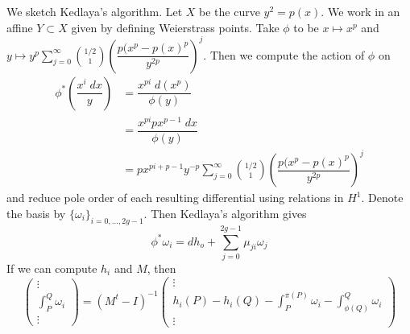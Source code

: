 \noindent{} \par\vspace{\baselineskip}
 

We sketch Kedlaya's algorithm. Let $X$ be the curve $y^2= p(x)$. We work in an affine $Y \subset X$ given by defining Weierstrass points. Take $\phi$ to be $x \mapsto x^p$ and $y \mapsto y^p \sum_{j=0}^\infty \binom{1/2}{1} \left( \dfrac{p(x^p - p(x)^p}{y^{2p}} \right)^j$. Then we compute the action of $\phi$ on
	\[
	\begin{aligned}
	\phi^*\left( \dfrac{x^i \;dx}{y} \right)&= \dfrac{x^{pi} \;d(x^p)}{\phi(y)} \\
	&= \dfrac{x^{pi} p x^{p-1} \;dx}{\phi(y)} \\
	&= p x^{pi + p - 1} y^{-p} \sum_{j=0}^\infty \binom{1/2}{1} \left( \dfrac{p(x^p - p(x)^p}{y^{2p}} \right)^j
	\end{aligned}
	\]
and reduce pole order of each resulting differential using relations in $H^1$. Denote the basis by $\{\omega_i\}_{i=0,\ldots,2g-1}$. Then Kedlaya's algorithm gives
	\[
	\phi^* \omega_i= dh_o + \sum_{j=0}^{2g-1} \mu_{ji} \omega_j
	\]
If we can compute $h_i$ and $M$, then
	\[
	\begin{pmatrix}
	\vdots \\
	\int_P^Q \omega_i \\
	\vdots
	\end{pmatrix}=
	(M^t - I)^{-1} 
	\begin{pmatrix}
	\vdots \\
	h_i(P) - h_i(Q) - \int_P^{\pi(P)} \omega_i - \int_{\phi(Q)}^Q \omega_i \\
	\vdots
	\end{pmatrix}
	\] %


